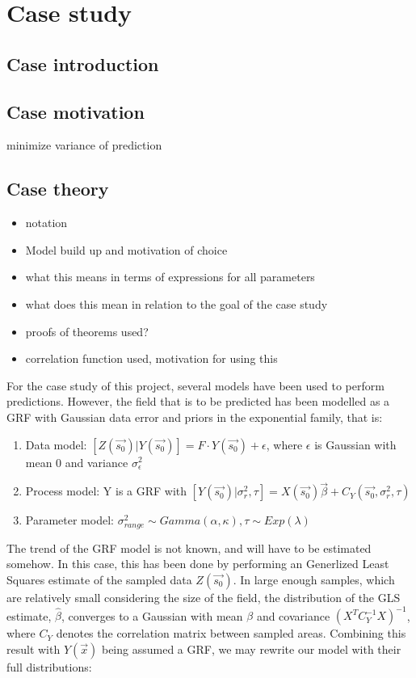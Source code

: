 \documentclass{report}
\begin{document}
\section{Case study}
\subsection{Case introduction}
\subsection{Case motivation}
minimize variance of prediction
\subsection{Case theory}
\begin{itemize}
\item notation
\item Model build up and motivation of choice
\item what this means in terms of expressions for all parameters
\item what does this mean in relation to the goal of the case study
\item proofs of theorems used?
\item correlation function used, motivation for using this
\end{itemize}
For the case study of this project, several models have been used to perform predictions. However, the field that is to be predicted has been modelled as a GRF with Gaussian data error and priors in the exponential family, that is: \\
\begin{enumerate}
\item Data model: $[Z(\vec{s_0})|Y(\vec{s_0})] = F \cdot Y(\vec{s_0}) + \epsilon$, where $\epsilon$ is Gaussian with mean 0 and variance $\sigma_{\epsilon}^2$
\item Process model: Y is a GRF with $[Y(\vec{s_0}) | \sigma_{r}^2, \tau]  = X(\vec{s_0})\vec{\beta} + C_Y(\vec{s_0}, \sigma_{r}^2, \tau)$
\item Parameter model: $\sigma_{range}^2 \sim Gamma(\alpha, \kappa), \tau \sim Exp(\lambda)$ 
\end{enumerate}
The trend of the GRF model is not known, and will have to be estimated somehow. In this case, this has been done by performing an Generlized Least Squares estimate of the sampled data $Z(\vec{s_0})$. In large enough samples, which are relatively small considering the size of the field, the distribution of the GLS estimate, $\hat\beta$, converges to a Gaussian with mean $\beta$ and covariance $(X^{T}C_Y^{-1}X)^{-1}$, where $C_Y$ denotes the correlation matrix between sampled areas. Combining this result with $Y(\vec{x})$ being assumed a GRF, we may rewrite our model with their full distributions:
\end{document}
